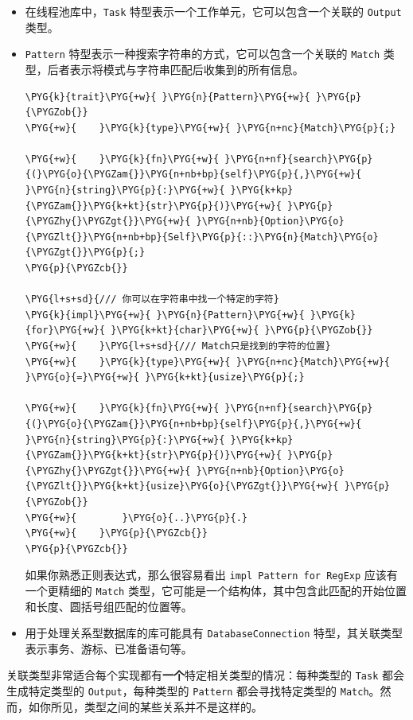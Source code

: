 \begin{itemize}
\item 在线程池库中，\texttt{Task} 特型表示一个工作单元，它可以包含一个关联的 \texttt{Output} 类型。
\item \texttt{Pattern} 特型表示一种搜索字符串的方式，它可以包含一个关联的 \texttt{Match} 类型，后者表示将模式与字符串匹配后收集到的所有信息。

\begin{Verbatim}[commandchars=\\\{\},breaklines=true,breakanywhere=true,fontsize=\codefont,xleftmargin=17bp]
\PYG{k}{trait}\PYG{+w}{ }\PYG{n}{Pattern}\PYG{+w}{ }\PYG{p}{\PYGZob{}}
\PYG{+w}{    }\PYG{k}{type}\PYG{+w}{ }\PYG{n+nc}{Match}\PYG{p}{;}

\PYG{+w}{    }\PYG{k}{fn}\PYG{+w}{ }\PYG{n+nf}{search}\PYG{p}{(}\PYG{o}{\PYGZam{}}\PYG{n+nb+bp}{self}\PYG{p}{,}\PYG{+w}{ }\PYG{n}{string}\PYG{p}{:}\PYG{+w}{ }\PYG{k+kp}{\PYGZam{}}\PYG{k+kt}{str}\PYG{p}{)}\PYG{+w}{ }\PYG{p}{\PYGZhy{}\PYGZgt{}}\PYG{+w}{ }\PYG{n+nb}{Option}\PYG{o}{\PYGZlt{}}\PYG{n+nb+bp}{Self}\PYG{p}{::}\PYG{n}{Match}\PYG{o}{\PYGZgt{}}\PYG{p}{;}
\PYG{p}{\PYGZcb{}}

\PYG{l+s+sd}{/// 你可以在字符串中找一个特定的字符}
\PYG{k}{impl}\PYG{+w}{ }\PYG{n}{Pattern}\PYG{+w}{ }\PYG{k}{for}\PYG{+w}{ }\PYG{k+kt}{char}\PYG{+w}{ }\PYG{p}{\PYGZob{}}
\PYG{+w}{    }\PYG{l+s+sd}{/// Match只是找到的字符的位置}
\PYG{+w}{    }\PYG{k}{type}\PYG{+w}{ }\PYG{n+nc}{Match}\PYG{+w}{ }\PYG{o}{=}\PYG{+w}{ }\PYG{k+kt}{usize}\PYG{p}{;}

\PYG{+w}{    }\PYG{k}{fn}\PYG{+w}{ }\PYG{n+nf}{search}\PYG{p}{(}\PYG{o}{\PYGZam{}}\PYG{n+nb+bp}{self}\PYG{p}{,}\PYG{+w}{ }\PYG{n}{string}\PYG{p}{:}\PYG{+w}{ }\PYG{k+kp}{\PYGZam{}}\PYG{k+kt}{str}\PYG{p}{)}\PYG{+w}{ }\PYG{p}{\PYGZhy{}\PYGZgt{}}\PYG{+w}{ }\PYG{n+nb}{Option}\PYG{o}{\PYGZlt{}}\PYG{k+kt}{usize}\PYG{o}{\PYGZgt{}}\PYG{+w}{ }\PYG{p}{\PYGZob{}}
\PYG{+w}{        }\PYG{o}{..}\PYG{p}{.}
\PYG{+w}{    }\PYG{p}{\PYGZcb{}}
\PYG{p}{\PYGZcb{}}
\end{Verbatim}

如果你熟悉正则表达式，那么很容易看出 \texttt{impl Pattern for RegExp} 应该有一个更精细的 \texttt{Match} 类型，它可能是一个结构体，其中包含此匹配的开始位置和长度、圆括号组匹配的位置等。
\item 用于处理关系型数据库的库可能具有 \texttt{DatabaseConnection} 特型，其关联类型表示事务、游标、已准备语句等。
\end{itemize}

关联类型非常适合每个实现都有\textbf{一个}特定相关类型的情况：每种类型的 \texttt{Task} 都会生成特定类型的 \texttt{Output}，每种类型的 \texttt{Pattern} 都会寻找特定类型的 \texttt{Match}。然而，如你所见，类型之间的某些关系并不是这样的。

